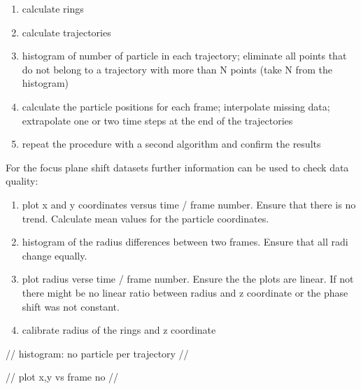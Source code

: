 \begin{enumerate}

    \item calculate rings

    \item calculate trajectories

    \item histogram of number of particle in each trajectory; eliminate all points that do not belong to a trajectory with more than N points (take N from the histogram)

    \item calculate the particle positions for each frame; interpolate missing data; extrapolate one or two time steps at the end of the trajectories

    \item repeat the procedure with a second algorithm and confirm the results

\end{enumerate}





For the focus plane shift datasets further information can be used to check data quality:

\begin{enumerate}

    \item plot x and y coordinates versus time / frame number. Ensure that there is no trend. Calculate mean values for the particle coordinates.

    \item histogram of the radius differences between two frames. Ensure that all radi change equally.

    \item plot radius verse time / frame number. Ensure the the plots are linear. If not there might be no linear ratio between radius and z coordinate or the phase shift was not constant.

    \item calibrate radius of the rings and z coordinate

\end{enumerate}





// histogram: no particle per trajectory //



// plot x,y vs frame no //



